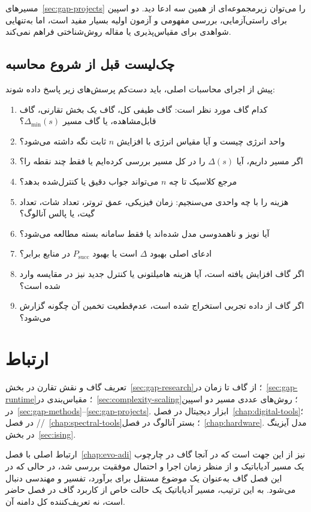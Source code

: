 مسیرهای~\ref{sec:gap-projects} را می‌توان زیرمجموعه‌ای از همین سه ادعا دید.
دو اسپین برای راستی‌آزمایی، بررسی مفهومی و آزمون اولیه بسیار مفید است، اما به‌تنهایی شواهدی برای مقیاس‌پذیری یا مقاله روش‌شناختی فراهم نمی‌کند.

\subsection{چک‌لیست قبل از شروع محاسبه}

پیش از اجرای محاسبات اصلی، باید دست‌کم پرسش‌های زیر پاسخ داده شوند:

\begin{enumerate}
	\item کدام گاف مورد نظر است: گاف طیفی کل، گاف یک بخش تقارنی، گاف قابل‌مشاهده، یا گاف مسیر $\Delta_{\min}(s)$؟
	\item واحد انرژی چیست و آیا مقیاس انرژی با افزایش $n$ ثابت نگه داشته می‌شود؟
	\item اگر مسیر داریم، آیا $\Delta(s)$ را در کل مسیر بررسی کرده‌ایم یا فقط چند نقطه را؟
	\item مرجع کلاسیک تا چه $n$ می‌تواند جواب دقیق یا کنترل‌شده بدهد؟
	\item هزینه را با چه واحدی می‌سنجیم: زمان فیزیکی، عمق تروتر، تعداد شات، تعداد گیت، یا پالس آنالوگ؟
	\item آیا نویز و ناهمدوسی مدل شده‌اند یا فقط سامانه بسته مطالعه می‌شود؟
	\item ادعای اصلی بهبود $\Delta$ است یا بهبود $P_{\mathrm{succ}}$ در منابع برابر؟
	\item اگر گاف افزایش یافته است، آیا هزینه هامیلتونی یا کنترل جدید نیز در مقایسه وارد شده است؟
	\item اگر گاف از داده تجربی استخراج شده است، عدم‌قطعیت تخمین آن چگونه گزارش می‌شود؟
\end{enumerate}

\section{ارتباط}

تعریف گاف و نقش تقارن در بخش~\ref{sec:gap-research}؛ از گاف تا زمان در~\ref{sec:gap-runtime}؛ مقیاس‌بندی در~\ref{sec:complexity-scaling}؛ روش‌های عددی مسیر دو اسپین در~\ref{sec:gap-methods}--\ref{sec:gap-projects}.
ابزار دیجیتال در فصل~\ref{chap:digital-tools}؛ // در فصل~\ref{chap:spectral-tools}؛ بستر آنالوگ در فصل~\ref{chap:hardware}.
مدل آیزینگ در بخش~\ref{sec:ising}.

ارتباط اصلی با فصل~\ref{chap:evo-adi} نیز از این جهت است که در آنجا گاف در چارچوب یک مسیر آدیاباتیک و از منظر زمان اجرا و احتمال موفقیت بررسی شد، در حالی که در این فصل گاف به‌عنوان یک موضوع مستقل برای برآورد، تفسیر و مهندسی دنبال می‌شود.
به این ترتیب، مسیر آدیاباتیک یک حالت خاص از کاربرد گاف در فصل حاضر است، نه تعریف‌کننده کل دامنه آن.

